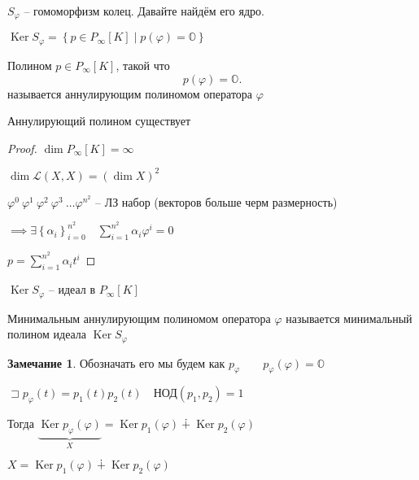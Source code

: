 \documentclass{book}
\DeclareMathOperator{\Ker}{Ker}
\theoremstyle{definition}
\newtheorem*{note}{Замечание}
\begin{document}
$S_{\varphi}$ -- гомоморфизм колец. Давайте найдём его ядро.

$\Ker S_{\varphi} = \left\{ p\in P_{\infty }[K] \mid p\left( \varphi \right)  = \mathds{O}\right\} $

\begin{definition}
    Полином $p\in P_{\infty }[K]$, такой что \[
        p\left( \varphi \right)  = \mathds{O}
    .\] называется аннулирующим полиномом оператора $\varphi$
\end{definition}

\begin{lemma}
    Аннулирующий полином существует
\end{lemma}
\begin{proof}
    $\dim P_{\infty }[K] = \infty $ 

    $\dim \mathscr{L}\left( X, X \right)  = \left( \dim X \right) ^2$

    $\varphi^0\ \varphi^1\ \varphi^2 \ \varphi^3 \ \ldots \varphi^{n^2}$ -- ЛЗ набор (векторов больше черм размерность)

    $\implies \exists \left\{ \alpha_i \right\} _{i=0}^{n^2}\quad \sum_{i=1}^{n^2} \alpha_i\varphi^i =0$

    $p = \sum_{i=1}^{n^2} \alpha_it^i$
\end{proof}

\begin{lemma}
    $\Ker S_{\varphi}$ -- идеал в $P_{\infty }[K]$ 
\end{lemma}

\begin{definition}
    Минимальным аннулирующим полиномом оператора $\varphi$ называется минимальный полином идеала  $\Ker S_{\varphi}$
\end{definition}

\begin{note}
    Обозначать его мы будем как $p_{\varphi}\qquad p_{\varphi}\left( \varphi \right) =\mathds{O}$
\end{note}

\begin{lemma}
    $\sqsupset p_{\varphi}(t) = p_1(t)p_2(t)\quad \text{НОД}\left( p_1,p_2 \right)  = 1$ 

    Тогда $\underbrace{\Ker p_{\varphi}(\varphi)}_X = \Ker p_1\left( \varphi \right)  \dotplus \Ker p_2\left( \varphi \right) $ 

    $X = \Ker p_1\left( \varphi \right) \dotplus \Ker p_2\left( \varphi \right) $
    
\end{lemma}
\end{document}
